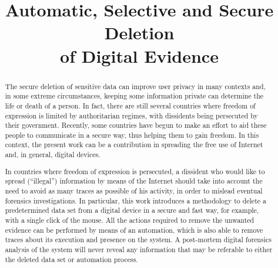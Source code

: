 \documentclass[conference]{IEEEtran}
\begin{document}
\title{Automatic, Selective and Secure Deletion\\of Digital Evidence}

\author{
}

\maketitle


\begin{abstract}
%

The secure deletion of sensitive data can improve user privacy in many contexts and, in some extreme circumstances, keeping some information private can determine the life or death of a person. In fact, there are still several countries where freedom of expression is limited by authoritarian regimes, with dissidents being persecuted by their government. Recently, some countries have begun to make an effort to aid these people to communicate in a secure way, thus helping them to gain freedom. In this context, the present work can be a contribution in spreading the free use of Internet and, in general, digital devices.

In countries where freedom of expression is persecuted, a dissident who would like to spread (“illegal”) information by means of the Internet should take into account the need to avoid as many traces as possible of his activity, in order to mislead eventual forensics investigations. In particular, this work introduces a methodology to delete a predetermined data set from a digital device in a secure and fast way, for example, with a single click of the mouse. All the actions required to remove the unwanted evidence can be performed by means of an automation, which is also able to remove traces about its execution and presence on the system. A post-mortem digital forensics analysis of the system will never reveal any information that may be referable to either the deleted data set or automation process.
\end{abstract}
\end{document}
